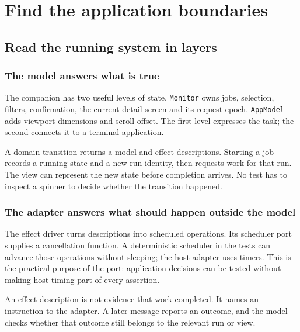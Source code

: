 \chapter{Find the application boundaries}\label{teaching-boundaries}

\section{Read the running system in layers}
\subsection{The model answers what is true}

The companion has two useful levels of state. \texttt{Monitor} owns jobs, selection, filters, confirmation, the current detail screen and its request epoch. \texttt{AppModel} adds viewport dimensions and scroll offset. The first level expresses the task; the second connects it to a terminal application.

A domain transition returns a model and effect descriptions. Starting a job records a running state and a new run identity, then requests work for that run. The view can represent the new state before completion arrives. No test has to inspect a spinner to decide whether the transition happened.

\subsection{The adapter answers what should happen outside the model}

The effect driver turns descriptions into scheduled operations. Its scheduler port supplies a cancellation function. A deterministic scheduler in the tests can advance those operations without sleeping; the host adapter uses timers. This is the practical purpose of the port: application decisions can be tested without making host timing part of every assertion.

An effect description is not evidence that work completed. It names an instruction to the adapter. A later message reports an outcome, and the model checks whether that outcome still belongs to the relevant run or view.

